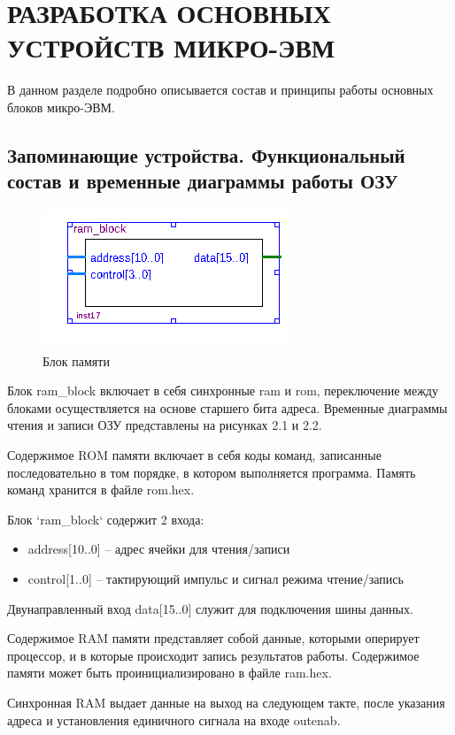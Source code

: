 \lstset{style=fsharpstyle}

\section{РАЗРАБОТКА ОСНОВНЫХ УСТРОЙСТВ МИКРО-ЭВМ}
\label{sec:practice:technology_used}

В данном разделе подробно описывается состав и принципы работы основных блоков микро-ЭВМ.

\subsection{Запоминающие устройства. Функциональный состав и временные диаграммы работы ОЗУ}
\begin{figure}[ht]{\textwidth}
\centering
    \includegraphics[scale=0.8]{ramb}
    \caption{Блок памяти}
\end{figure}

Блок ram\_block включает в себя синхронные ram и rom, переключение между блоками осуществляется на основе старшего бита адреса.
Временные диаграммы чтения и записи ОЗУ представлены на рисунках 2.1 и 2.2.

Содержимое ROM памяти включает в себя коды команд, записанные последовательно в том порядке, в котором выполняется программа.
Память команд хранится в файле rom.hex.

Блок `ram\_block` содержит 2 входа:
\begin{itemize}
    \item address[10..0] -- адрес ячейки для чтения/записи
    \item control[1..0] -- тактирующий импульс и сигнал режима чтение/запись
\end{itemize}
Двунаправленный вход data[15..0] служит для подключения шины данных.

Содержимое RAM памяти представляет собой данные, которыми оперирует процессор, и в которые происходит запись результатов работы. Содержимое памяти может быть проинициализировано в файле ram.hex.

Синхронная RAM выдает данные на выход на следующем такте, после указания адреса и установления единичного сигнала на входе outenab.

